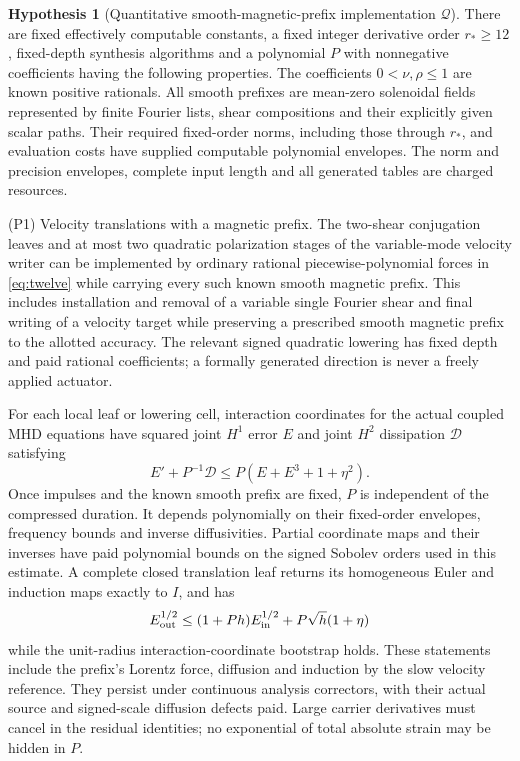 \documentclass[11pt,a4paper]{amsart}
\theoremstyle{definition}
\newtheorem{hypothesis}[theorem]{Hypothesis}
\theoremstyle{remark}
\numberwithin{equation}{section}
\newcommand{\Qcal}{\mathcal Q}
\begin{document}
\begin{hypothesis}[Quantitative smooth-magnetic-prefix implementation $\Qcal$]\label{hyp:Q}
There are fixed effectively computable constants, a fixed integer derivative order $r_*\ge12$, fixed-depth synthesis algorithms and a polynomial $P$ with nonnegative coefficients having the following properties. The coefficients $0<\nu,\rho\le1$ are known positive rationals. All smooth prefixes are mean-zero solenoidal fields represented by finite Fourier lists, shear compositions and their explicitly given scalar paths. Their required fixed-order norms, including those through $r_*$, and evaluation costs have supplied computable polynomial envelopes. The norm and precision envelopes, complete input length and all generated tables are charged resources.

\medskip\noindent
\textup{(P1) Velocity translations with a magnetic prefix.}
The two-shear conjugation leaves and at most two quadratic polarization stages of the variable-mode velocity writer can be implemented by ordinary rational piecewise-polynomial forces in \eqref{eq:twelve} while carrying every such known smooth magnetic prefix. This includes installation and removal of a variable single Fourier shear and final writing of a velocity target while preserving a prescribed smooth magnetic prefix to the allotted accuracy. The relevant signed quadratic lowering has fixed depth and paid rational coefficients; a formally generated direction is never a freely applied actuator.

For each local leaf or lowering cell, interaction coordinates for the actual coupled MHD equations have squared joint $H^1$ error $E$ and joint $H^2$ dissipation $\mathcal D$ satisfying
\begin{equation}\label{eq:Qenergy}
 E'+P^{-1}\mathcal D\le P(E+E^3+1+\eta^2).
\end{equation}
Once impulses and the known smooth prefix are fixed, $P$ is independent of the compressed duration. It depends polynomially on their fixed-order envelopes, frequency bounds and inverse diffusivities. Partial coordinate maps and their inverses have paid polynomial bounds on the signed Sobolev orders used in this estimate. A complete closed translation leaf returns its homogeneous Euler and induction maps exactly to $I$, and has
\begin{equation}\label{eq:Qleaf}
 E_{\rm out}^{1/2}\le(1+Ph)E_{\rm in}^{1/2}
                      +P\sqrt h(1+\eta)
\end{equation}
while the unit-radius interaction-coordinate bootstrap holds. These statements include the prefix's Lorentz force, diffusion and induction by the slow velocity reference. They persist under continuous analysis correctors, with their actual source and signed-scale diffusion defects paid. Large carrier derivatives must cancel in the residual identities; no exponential of total absolute strain may be hidden in $P$.


\end{hypothesis}
\end{document}
